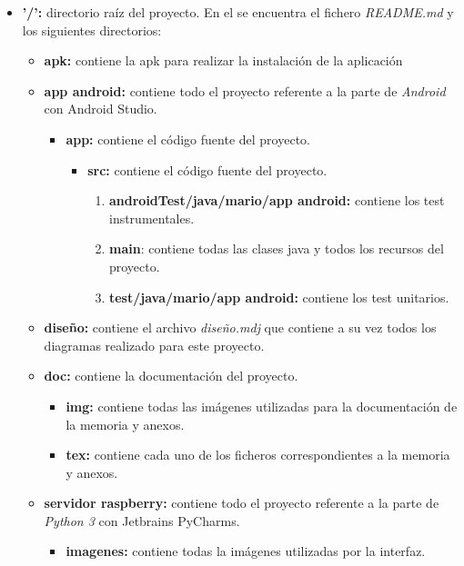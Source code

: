 \begin{itemize}
	\item \textbf{'/':} directorio raíz del proyecto. En el se encuentra el fichero \textit{README.md} y los siguientes directorios:
	\begin{itemize}
		\item \textbf{apk:} contiene la apk para realizar la instalación de la aplicación
		\item \textbf{app android:} contiene todo el proyecto referente a la parte de \textit{Android} con Android Studio.
		\begin{itemize}
			\item \textbf{app:} contiene el código fuente del proyecto.
			\begin{itemize}
				\item \textbf{src:} contiene el código fuente del proyecto.
				\begin{enumerate}
					\item \textbf{androidTest/java/mario/app android:} contiene los test instrumentales.
					\item \textbf{main}: contiene todas las clases java y todos los recursos del proyecto.
					\item \textbf{test/java/mario/app android:} contiene los test unitarios.
				\end{enumerate}
			\end{itemize}
		\end{itemize}
		\item \textbf{diseño:} contiene el archivo \textit{diseño.mdj} que contiene a su vez todos los diagramas realizado para este proyecto.
		\item \textbf{doc:} contiene la documentación del proyecto.
		\begin{itemize}
			\item \textbf{img:} contiene todas las imágenes utilizadas para la documentación de la memoria y anexos.
			\item \textbf{tex:} contiene cada uno de los ficheros correspondientes a la memoria y anexos.
		\end{itemize}
		\item \textbf{servidor raspberry:} contiene todo el proyecto referente a la parte de \textit{Python 3} con Jetbrains PyCharms.
		\begin{itemize}
			\item \textbf{imagenes:} contiene todas la imágenes utilizadas por la interfaz.
		\end{itemize}
	\end{itemize}
\end{itemize}


